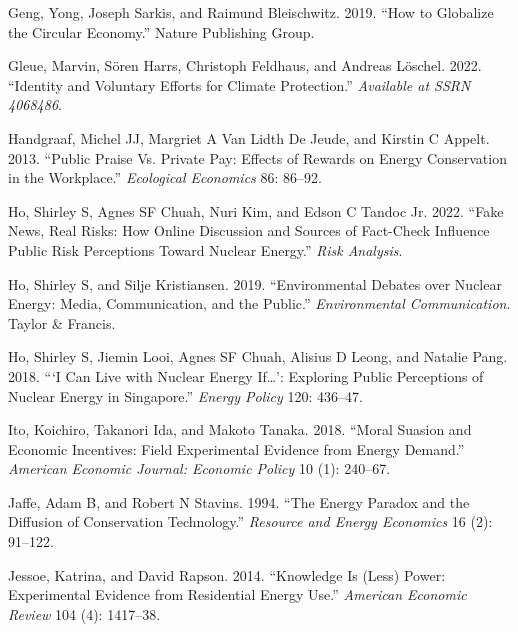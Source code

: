 \documentclass[
  11pt,
]{article}
\newlength{\cslhangindent}
\newlength{\cslentryspacingunit} %
\newenvironment{CSLReferences}[2] %
 {%
  \setlength{\parindent}{0pt}
  \ifodd #1
  \let\oldpar\par
  \def\par{\hangindent=\cslhangindent\oldpar}
  \fi
  \setlength{\parskip}{#2\cslentryspacingunit}
 }%
 {}
\begin{document}
\begin{CSLReferences}{1}{0}
\leavevmode{}%
Geng, Yong, Joseph Sarkis, and Raimund Bleischwitz. 2019. {``How to
Globalize the Circular Economy.''} Nature Publishing Group.

\leavevmode{}%
Gleue, Marvin, Sören Harrs, Christoph Feldhaus, and Andreas Löschel.
2022. {``Identity and Voluntary Efforts for Climate Protection.''}
\emph{Available at SSRN 4068486}.

\leavevmode{}%
Handgraaf, Michel JJ, Margriet A Van Lidth De Jeude, and Kirstin C
Appelt. 2013. {``Public Praise Vs. Private Pay: Effects of Rewards on
Energy Conservation in the Workplace.''} \emph{Ecological Economics} 86:
86--92.

\leavevmode{}%
Ho, Shirley S, Agnes SF Chuah, Nuri Kim, and Edson C Tandoc Jr. 2022.
{``Fake News, Real Risks: How Online Discussion and Sources of
Fact-Check Influence Public Risk Perceptions Toward Nuclear Energy.''}
\emph{Risk Analysis}.

\leavevmode{}%
Ho, Shirley S, and Silje Kristiansen. 2019. {``Environmental Debates
over Nuclear Energy: Media, Communication, and the Public.''}
\emph{Environmental Communication}. Taylor \& Francis.

\leavevmode{}%
Ho, Shirley S, Jiemin Looi, Agnes SF Chuah, Alisius D Leong, and Natalie
Pang. 2018. {``{`I Can Live with Nuclear Energy If{\ldots{}}'}:
Exploring Public Perceptions of Nuclear Energy in Singapore.''}
\emph{Energy Policy} 120: 436--47.

\leavevmode{}%
Ito, Koichiro, Takanori Ida, and Makoto Tanaka. 2018. {``Moral Suasion
and Economic Incentives: Field Experimental Evidence from Energy
Demand.''} \emph{American Economic Journal: Economic Policy} 10 (1):
240--67.

\leavevmode{}%
Jaffe, Adam B, and Robert N Stavins. 1994. {``The Energy Paradox and the
Diffusion of Conservation Technology.''} \emph{Resource and Energy
Economics} 16 (2): 91--122.

\leavevmode{}%
Jessoe, Katrina, and David Rapson. 2014. {``Knowledge Is (Less) Power:
Experimental Evidence from Residential Energy Use.''} \emph{American
Economic Review} 104 (4): 1417--38.


\end{CSLReferences}
\end{document}
